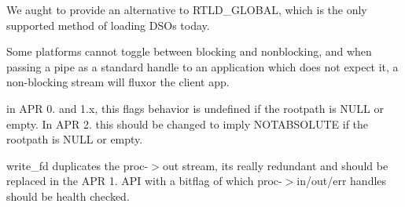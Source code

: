 
\begin{DoxyRefList}
\item[\label{bug__bug000001}%
\hypertarget{bug__bug000001}{}%
Global \hyperlink{group__apr__dso_gaedc8609c2bb76e5c43f2df2281a9d8b6}{apr\+\_\+dso\+\_\+load} (apr\+\_\+dso\+\_\+handle\+\_\+t $\ast$$\ast$res\+\_\+handle, const char $\ast$path, apr\+\_\+pool\+\_\+t $\ast$ctx)]We aught to provide an alternative to R\+T\+L\+D\+\_\+\+G\+L\+O\+B\+AL, which is the only supported method of loading D\+S\+Os today.  
\item[\label{bug__bug000003}%
\hypertarget{bug__bug000003}{}%
Global \hyperlink{group__apr__file__io_gaae3b81342d239c58c351cf11190740ed}{apr\+\_\+file\+\_\+pipe\+\_\+create} (apr\+\_\+file\+\_\+t $\ast$$\ast$in, apr\+\_\+file\+\_\+t $\ast$$\ast$out, apr\+\_\+pool\+\_\+t $\ast$pool)]Some platforms cannot toggle between blocking and nonblocking, and when passing a pipe as a standard handle to an application which does not expect it, a non-\/blocking stream will fluxor the client app.  
\item[\label{bug__bug000002}%
\hypertarget{bug__bug000002}{}%
Global \hyperlink{group__apr__filepath_gabb57ce7b23caf512d7f64b92a662ab3d}{A\+P\+R\+\_\+\+F\+I\+L\+E\+P\+A\+T\+H\+\_\+\+N\+O\+T\+A\+B\+O\+V\+E\+R\+O\+OT} ]in A\+PR 0. and 1.\+x, this flag\textquotesingle{}s behavior is undefined if the rootpath is N\+U\+LL or empty. In A\+PR 2. this should be changed to imply N\+O\+T\+A\+B\+S\+O\+L\+U\+TE if the rootpath is N\+U\+LL or empty.  
\item[\label{bug__bug000010}%
\hypertarget{bug__bug000010}{}%
Global \hyperlink{group__apr__thread__proc_ga5a9d123afe81eaa97955fbe45704b662}{apr\+\_\+proc\+\_\+other\+\_\+child\+\_\+register} (\hyperlink{structapr__proc__t}{apr\+\_\+proc\+\_\+t} $\ast$proc, void($\ast$maintenance)(int reason, void $\ast$, int status), void $\ast$data, apr\+\_\+file\+\_\+t $\ast$write\+\_\+fd, apr\+\_\+pool\+\_\+t $\ast$p)]write\+\_\+fd duplicates the proc-\/$>$out stream, it\textquotesingle{}s really redundant and should be replaced in the A\+PR 1. A\+PI with a bitflag of which proc-\/$>$in/out/err handles should be health checked. 


\end{DoxyRefList}
